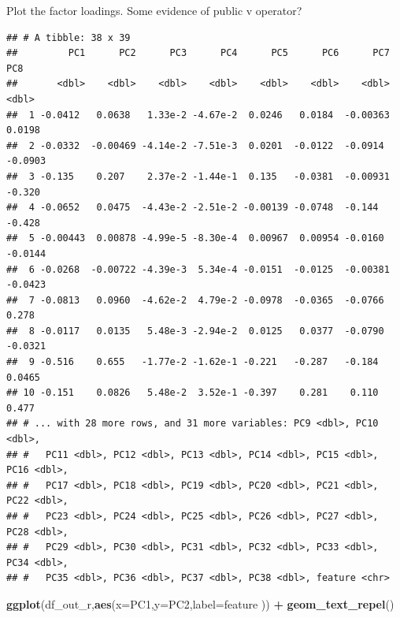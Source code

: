 \documentclass[
]{book}
\newenvironment{Shaded}{\begin{snugshade}}{\end{snugshade}}
\newcommand{\DataTypeTok}[1]{\textcolor[rgb]{0.13,0.29,0.53}{#1}}
\newcommand{\DecValTok}[1]{\textcolor[rgb]{0.00,0.00,0.81}{#1}}
\newcommand{\KeywordTok}[1]{\textcolor[rgb]{0.13,0.29,0.53}{\textbf{#1}}}
\newcommand{\NormalTok}[1]{#1}
\newcommand{\OperatorTok}[1]{\textcolor[rgb]{0.81,0.36,0.00}{\textbf{#1}}}
\newcommand{\StringTok}[1]{\textcolor[rgb]{0.31,0.60,0.02}{#1}}
\begin{document}
Plot the factor loadings. Some evidence of public v operator?

\begin{Shaded}
\end{Shaded}

\begin{verbatim}
## # A tibble: 38 x 39
##         PC1      PC2      PC3      PC4      PC5      PC6      PC7     PC8
##       <dbl>    <dbl>    <dbl>    <dbl>    <dbl>    <dbl>    <dbl>   <dbl>
##  1 -0.0412   0.0638   1.33e-2 -4.67e-2  0.0246   0.0184  -0.00363  0.0198
##  2 -0.0332  -0.00469 -4.14e-2 -7.51e-3  0.0201  -0.0122  -0.0914  -0.0903
##  3 -0.135    0.207    2.37e-2 -1.44e-1  0.135   -0.0381  -0.00931 -0.320 
##  4 -0.0652   0.0475  -4.43e-2 -2.51e-2 -0.00139 -0.0748  -0.144   -0.428 
##  5 -0.00443  0.00878 -4.99e-5 -8.30e-4  0.00967  0.00954 -0.0160  -0.0144
##  6 -0.0268  -0.00722 -4.39e-3  5.34e-4 -0.0151  -0.0125  -0.00381 -0.0423
##  7 -0.0813   0.0960  -4.62e-2  4.79e-2 -0.0978  -0.0365  -0.0766   0.278 
##  8 -0.0117   0.0135   5.48e-3 -2.94e-2  0.0125   0.0377  -0.0790  -0.0321
##  9 -0.516    0.655   -1.77e-2 -1.62e-1 -0.221   -0.287   -0.184    0.0465
## 10 -0.151    0.0826   5.48e-2  3.52e-1 -0.397    0.281    0.110    0.477 
## # ... with 28 more rows, and 31 more variables: PC9 <dbl>, PC10 <dbl>,
## #   PC11 <dbl>, PC12 <dbl>, PC13 <dbl>, PC14 <dbl>, PC15 <dbl>, PC16 <dbl>,
## #   PC17 <dbl>, PC18 <dbl>, PC19 <dbl>, PC20 <dbl>, PC21 <dbl>, PC22 <dbl>,
## #   PC23 <dbl>, PC24 <dbl>, PC25 <dbl>, PC26 <dbl>, PC27 <dbl>, PC28 <dbl>,
## #   PC29 <dbl>, PC30 <dbl>, PC31 <dbl>, PC32 <dbl>, PC33 <dbl>, PC34 <dbl>,
## #   PC35 <dbl>, PC36 <dbl>, PC37 <dbl>, PC38 <dbl>, feature <chr>
\end{verbatim}

\begin{Shaded}
\begin{Highlighting}[]
\KeywordTok{ggplot}\NormalTok{(df_out_r,}\KeywordTok{aes}\NormalTok{(}\DataTypeTok{x=}\NormalTok{PC1,}\DataTypeTok{y=}\NormalTok{PC2,}\DataTypeTok{label=}\NormalTok{feature )) }\OperatorTok{+}\StringTok{ }\KeywordTok{geom_text_repel}\NormalTok{()}
\end{Highlighting}
\end{Shaded}
\end{document}
